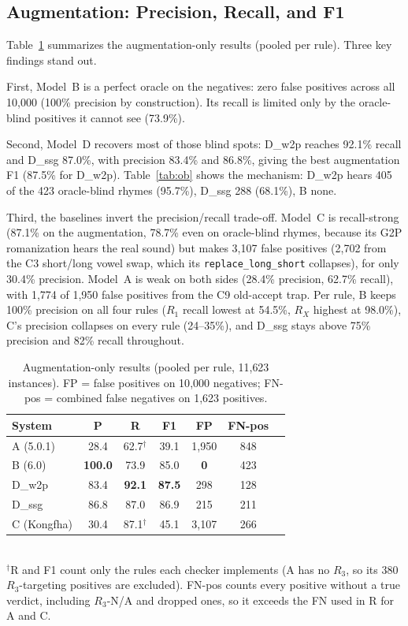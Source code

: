 \documentclass[conference]{IEEEtran}
\begin{document}
\subsection{Augmentation: Precision, Recall, and F1}

Table~\ref{tab:aug} summarizes the augmentation-only results (pooled per
rule). Three key findings stand out.

First, Model~B is a perfect oracle on the negatives: zero false positives
across all 10{,}000 (100\% precision by construction). Its recall is
limited only by the oracle-blind
positives it cannot see (73.9\%).

Second, Model~D recovers most of those blind spots: D\_w2p reaches 92.1\%
recall and D\_ssg 87.0\%, with precision 83.4\% and 86.8\%, giving the best
augmentation F1 (87.5\% for D\_w2p). Table~\ref{tab:ob} shows the
mechanism: D\_w2p hears 405 of the 423 oracle-blind rhymes (95.7\%), D\_ssg
288 (68.1\%), B none.

Third, the baselines invert the precision/recall trade-off. Model~C is
recall-strong (87.1\% on the augmentation, 78.7\% even on oracle-blind
rhymes, because its G2P romanization hears the real sound) but makes
3{,}107 false positives (2{,}702 from the C3 short/long vowel swap, which
its \texttt{replace\_long\_short} collapses), for only 30.4\% precision.
Model~A is weak on both sides (28.4\% precision, 62.7\% recall), with
1{,}774 of 1{,}950 false positives from the C9 old-accept trap. Per rule,
B keeps 100\% precision on all four rules ($R_1$ recall lowest at 54.5\%, $R_X$
highest at 98.0\%), C's precision collapses on every rule (24--35\%), and
D\_ssg stays above 75\% precision and 82\% recall throughout.

\begin{table}[t]
\caption{Augmentation-only results (pooled per rule, 11{,}623 instances).
FP = false positives on 10{,}000 negatives; FN-pos = combined false
negatives on 1{,}623 positives.}
\label{tab:aug}
\centering
\footnotesize
\begin{tabular}{lcccccc}
\toprule
System & P & R & F1 & FP & FN-pos \\
\midrule
A (5.0.1) & 28.4 & 62.7$^{\dagger}$ & 39.1 & 1,950 & 848 \\
B (6.0) & \textbf{100.0} & 73.9 & 85.0 & \textbf{0} & 423 \\
D\_w2p & 83.4 & \textbf{92.1} & \textbf{87.5} & 298 & 128 \\
D\_ssg & 86.8 & 87.0 & 86.9 & 215 & 211 \\
C (Kongfha) & 30.4 & 87.1$^{\dagger}$ & 45.1 & 3,107 & 266 \\
\bottomrule
\end{tabular}
\\[2pt]
\footnotesize
$^{\dagger}$R and F1 count only the rules each checker implements (A has no
$R_3$, so its 380 $R_3$-targeting positives are excluded). FN-pos counts every
positive without a true verdict, including $R_3$-N/A and dropped ones, so it
exceeds the FN used in R for A and C.
\end{table}
\end{document}
